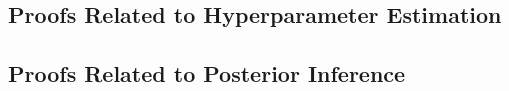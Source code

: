 \subsection{Proofs Related to Hyperparameter Estimation}\label{proofs-hyperparameter-estimation}



\subsection{Proofs Related to Posterior Inference}\label{proofs-posterior-inference}
